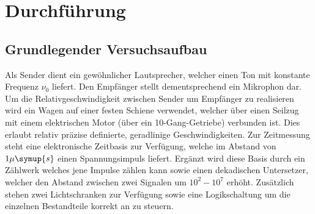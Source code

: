 \newpage
\section{Durchführung}
\label{sec:Durchführung}
\subsection{Grundlegender Versuchsaufbau}
\label{sec:Aufbau}
Als Sender dient ein gewöhnlicher Lautsprecher, welcher einen Ton mit
konstante Frequenz
$\nu_0$ liefert. Den Empfänger stellt dementsprechend ein Mikrophon dar.
Um die Relativgeschwindigkeit zwischen Sender um Empfänger zu realisieren wird
ein Wagen auf einer festen Schiene verwendet, welcher über einen Seilzug mit
einem elektrischen Motor (über ein 10-Gang-Getriebe) verbunden ist. Dies
erlaubt relativ präzise definierte, geradlinige Geschwindigkeiten.
Zur Zeitmessung steht eine elektronische Zeitbasis zur Verfügung, welche im
Abstand von $1 \mu \symup{s}$ einen Spannungsimpuls liefert. Ergänzt wird
diese Basis durch ein Zählwerk welches jene Impulse zählen kann sowie einen
dekadischen Untersetzer, welcher den Abstand zwischen zwei Signalen um
$10^2 - 10^7$ erhöht. Zusätzlich stehen zwei Lichtschranken zur Verfügung
sowie eine Logikschaltung um die einzelnen Bestandteile korrekt an zu steuern.

